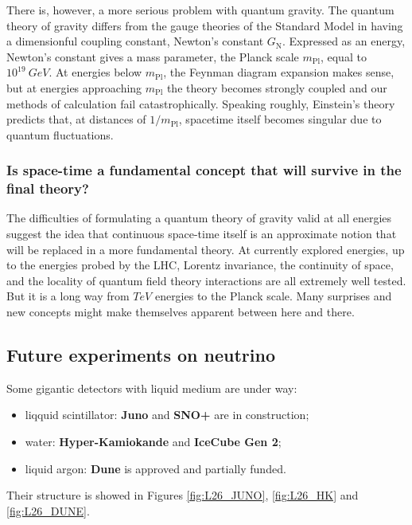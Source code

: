 \documentclass[../../main/main.tex]{subfiles}
\begin{document}
There is, however, a more serious problem with quantum gravity. The quantum theory of gravity differs from the gauge theories of the Standard Model in having a dimensionful coupling constant, Newton's constant \( G_{\mathrm{N}} \). Expressed as an energy, Newton's constant gives a mass parameter, the Planck scale \( m_{\mathrm{Pl}} \), equal to \( 10^{19} \ \si{GeV} \). At energies below \( m_{\mathrm{Pl}} \), the Feynman diagram expansion makes sense, but at energies approaching \( m_{\mathrm{Pl}} \) the theory becomes strongly coupled and our methods of calculation fail catastrophically. Speaking roughly, Einstein's theory predicts that, at distances of \( 1 / m_{\mathrm{Pl}} \), spacetime itself becomes singular due to quantum fluctuations.


\subsubsection{Is space-time a fundamental concept that will survive in the final theory?}
The difficulties of formulating a quantum theory of gravity valid at all energies suggest the idea that continuous space-time itself is an approximate notion that will be replaced in a more fundamental theory. At currently explored energies, up to the energies probed by the LHC, Lorentz invariance, the continuity of space, and the locality of quantum field theory interactions are all extremely well tested. But it is a long way from \( \si{TeV} \) energies to the Planck scale. Many surprises and new concepts might make themselves apparent between here and there.



\subsection{Future experiments on neutrino}
Some gigantic detectors with liquid medium are under way:
\begin{itemize}
	\item liqquid scintillator: \textbf{Juno} and \textbf{SNO+} are in construction;
	\item water: \textbf{Hyper-Kamiokande} and \textbf{IceCube Gen 2};
	\item liquid argon: \textbf{Dune} is approved and partially funded.
\end{itemize}
Their structure is showed in Figures \ref{fig:L26_JUNO}, \ref{fig:L26_HK} and \ref{fig:L26_DUNE}.
\end{document}
